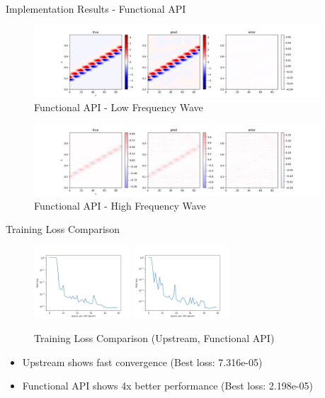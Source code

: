 \documentclass{beamer}
\begin{document}
\begin{frame}{Implementation Results - Functional API}
    \begin{figure}
        \includegraphics[width=0.95\textwidth]{functional_vis_low.png}
        \caption{Functional API - Low Frequency Wave}
    \end{figure}
    \vspace{0.3cm}
    \begin{figure}
        \includegraphics[width=0.95\textwidth]{functional_vis_high.png}
        \caption{Functional API - High Frequency Wave}
    \end{figure}
\end{frame}

\begin{frame}{Training Loss Comparison}
    \begin{figure}
        \includegraphics[width=0.32\textwidth]{upstream_loss.png}
        \includegraphics[width=0.32\textwidth]{functional_loss_low.png}
        \caption{Training Loss Comparison (Upstream, Functional API)}
    \end{figure}
    \begin{itemize}
        \item Upstream shows fast convergence (Best loss: 7.316e-05)
        \item Functional API shows 4x better performance (Best loss: 2.198e-05)
    \end{itemize}
\end{frame}
\end{document}
